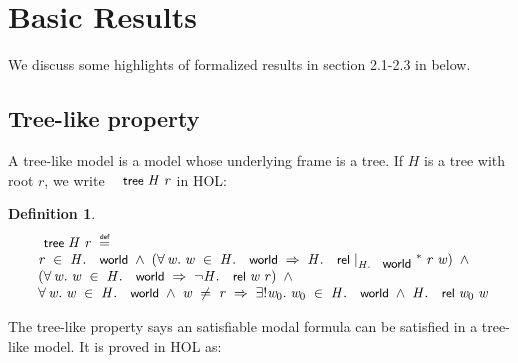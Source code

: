 \documentclass{llncs}
\newtheorem{defn}{Definition}[chapter]
\newenvironment{holmath}{\begin{displaymath}\begin{array}{l}}{\end{array}\end{displaymath}\ignorespacesafterend}
\renewcommand{\HOLConst}[1]{{\textsf{\upshape\small #1}}}
\renewcommand{\HOLinline}[1]{\ensuremath{#1}}
\renewcommand{\HOLFieldName}[1]{\HOLConst{#1}}
\begin{document}
\section{Basic Results}%
We discuss some highlights of formalized results in section 2.1-2.3 in \cite{Blackburn} below.
\subsection{Tree-like property}
A tree-like model is a model whose underlying frame is a tree. If $H$ is a tree with root $r$, we write \HOLinline{\HOLConst{tree}\;\HOLFreeVar{H}\;\HOLFreeVar{r}} in HOL:
\begin{defn}
{\upshape\cite[Definition 1.7]{Blackburn}}
\begin{holmath}
   \HOLConst{tree}\;\HOLFreeVar{H}\;\HOLFreeVar{r}\;\HOLTokenDefEquality{}\\
\;\;\HOLFreeVar{r}\;\HOLSymConst{\HOLTokenIn{}}\;\HOLFreeVar{H}.\HOLFieldName{world}\;\HOLSymConst{\HOLTokenConj{}}\;(\HOLSymConst{\HOLTokenForall{}}\HOLBoundVar{w}.\;\HOLBoundVar{w}\;\HOLSymConst{\HOLTokenIn{}}\;\HOLFreeVar{H}.\HOLFieldName{world}\;\HOLSymConst{\HOLTokenImp{}}\;{\HOLFreeVar{H}.\HOLFieldName{rel}}\ensuremath{\mid}\sb{\HOLFreeVar{H}.\HOLFieldName{world}}\HOLSymConst{\HOLTokenSupStar{}}\;\HOLFreeVar{r}\;\HOLBoundVar{w})\;\HOLSymConst{\HOLTokenConj{}}\\
\;\;(\HOLSymConst{\HOLTokenForall{}}\HOLBoundVar{w}.\;\HOLBoundVar{w}\;\HOLSymConst{\HOLTokenIn{}}\;\HOLFreeVar{H}.\HOLFieldName{world}\;\HOLSymConst{\HOLTokenImp{}}\;\HOLSymConst{\HOLTokenNeg{}}\HOLFreeVar{H}.\HOLFieldName{rel}\;\HOLBoundVar{w}\;\HOLFreeVar{r})\;\HOLSymConst{\HOLTokenConj{}}\\
\;\;\HOLSymConst{\HOLTokenForall{}}\HOLBoundVar{w}.\;\HOLBoundVar{w}\;\HOLSymConst{\HOLTokenIn{}}\;\HOLFreeVar{H}.\HOLFieldName{world}\;\HOLSymConst{\HOLTokenConj{}}\;\HOLBoundVar{w}\;\HOLSymConst{\HOLTokenNotEqual{}}\;\HOLFreeVar{r}\;\HOLSymConst{\HOLTokenImp{}}\;\HOLSymConst{\HOLTokenUnique{}}\HOLBoundVar{w}\sb{\mathrm{0}}.\;\HOLBoundVar{w}\sb{\mathrm{0}}\;\HOLSymConst{\HOLTokenIn{}}\;\HOLFreeVar{H}.\HOLFieldName{world}\;\HOLSymConst{\HOLTokenConj{}}\;\HOLFreeVar{H}.\HOLFieldName{rel}\;\HOLBoundVar{w}\sb{\mathrm{0}}\;\HOLBoundVar{w}
\end{holmath}
\end{defn}
The tree-like property says an satisfiable modal formula can be satisfied in a tree-like model. It is proved in HOL as:
\end{document}

